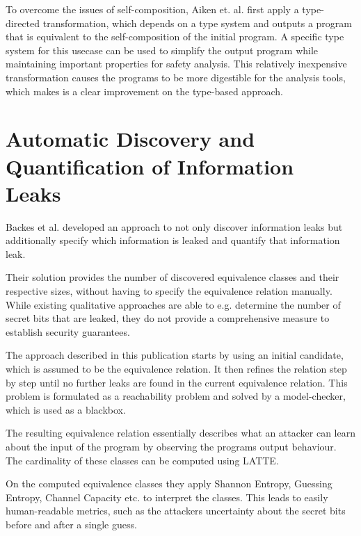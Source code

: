 \documentclass[a4paper,UKenglish]{lipics-v2018}
\begin{document}
To overcome the issues of self-composition, Aiken et. al. first apply a type-directed transformation, which depends on a type system and outputs a program that is equivalent to the self-composition of the initial program. A specific type system for this usecase can be used to simplify the output program while maintaining important properties for safety analysis. This relatively inexpensive transformation causes the programs to be more digestible for the analysis tools, which makes is a clear  improvement on the type-based approach.\cite{secure_information_flow_safety}



\newpage
\section{Automatic Discovery and Quantification of Information Leaks}

Backes et al. developed an approach to not only discover information leaks but additionally specify which information is leaked and quantify that information leak.\cite{automatic_discovery_and_quantification}

Their solution provides the number of discovered equivalence classes and their respective sizes, without having to specify the equivalence relation manually. While existing qualitative approaches are able to e.g. determine the number of secret bits that are leaked, they do not provide a comprehensive measure to establish security guarantees.\cite{automatic_discovery_and_quantification}

The approach described in this publication starts by using an initial candidate, which is assumed to be the equivalence relation. It then refines the relation step by step until no further leaks are found in the current equivalence relation. This problem is formulated as a reachability problem and solved by a model-checker, which is used as a blackbox.\cite{automatic_discovery_and_quantification}

The resulting equivalence relation essentially describes what an attacker can learn about the input of the program by observing the programs output behaviour. The cardinality of these classes can be computed using LATTE.\cite{automatic_discovery_and_quantification}

On the computed equivalence classes they apply Shannon Entropy, Guessing Entropy, Channel Capacity etc. to interpret the classes. This leads to easily human-readable metrics, such as the attackers uncertainty about the secret bits before and after a single guess.\cite{automatic_discovery_and_quantification}
\end{document}
